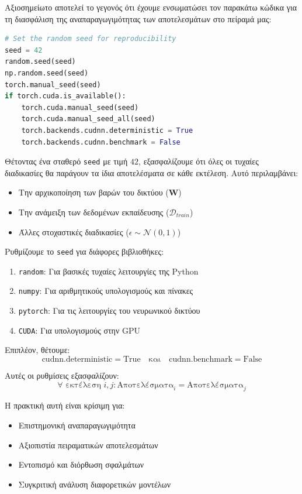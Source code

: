 \documentclass[a4paper,12pt]{article}
\begin{document}
Αξιοσημείωτο αποτελεί το γεγονός ότι έχουμε ενσωματώσει τον παρακάτω κώδικα 
για τη διασφάλιση της αναπαραγωγιμότητας των αποτελεσμάτων στο πείραμά μας:

\begin{lstlisting}[language=Python]
# Set the random seed for reproducibility
seed = 42
random.seed(seed)
np.random.seed(seed)
torch.manual_seed(seed)
if torch.cuda.is_available():
    torch.cuda.manual_seed(seed)
    torch.cuda.manual_seed_all(seed)
    torch.backends.cudnn.deterministic = True
    torch.backends.cudnn.benchmark = False
\end{lstlisting}

Θέτοντας ένα σταθερό \texttt{seed} με τιμή $42$, εξασφαλίζουμε ότι όλες οι τυχαίες διαδικασίες θα παράγουν τα ίδια αποτελέσματα σε κάθε εκτέλεση. Αυτό περιλαμβάνει:

\begin{itemize}
    \item Την αρχικοποίηση των βαρών του δικτύου ($\mathbf{W}$)
    \item Την ανάμειξη των δεδομένων εκπαίδευσης ($\mathcal{D}_{train}$)
    \item Άλλες στοχαστικές διαδικασίες ($\epsilon \sim \mathcal{N}(0,1)$)
\end{itemize}

Ρυθμίζουμε το \texttt{seed} για διάφορες βιβλιοθήκες:
\begin{enumerate}
    \item \texttt{random}: Για βασικές τυχαίες λειτουργίες της Python
    \item \texttt{numpy}: Για αριθμητικούς υπολογισμούς και πίνακες
    \item \texttt{pytorch}: Για τις λειτουργίες του νευρωνικού δικτύου
    \item \texttt{CUDA}: Για υπολογισμούς στην GPU
\end{enumerate}

Επιπλέον, θέτουμε:
\[
\text{cudnn.deterministic} = \text{True} \quad \text{και} \quad \text{cudnn.benchmark} = \text{False}
\]

Αυτές οι ρυθμίσεις εξασφαλίζουν:
\begin{equation}
    \forall \text{ εκτέλεση } i,j: \text{Αποτελέσματα}_i = \text{Αποτελέσματα}_j
\end{equation}

Η πρακτική αυτή είναι κρίσιμη για:
\begin{itemize}
    \item Επιστημονική αναπαραγωγιμότητα
    \item Αξιοπιστία πειραματικών αποτελεσμάτων
    \item Εντοπισμό και διόρθωση σφαλμάτων
    \item Συγκριτική ανάλυση διαφορετικών μοντέλων
\end{itemize}
\end{document}
